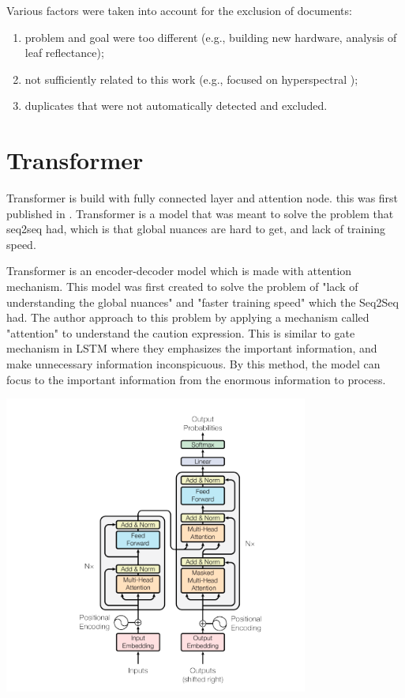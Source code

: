 Various factors were taken into account for the exclusion of documents:
\begin{enumerate}
    \item problem and goal were too different (e.g., building new hardware, analysis of leaf reflectance);
    \item not sufficiently related to this work (e.g., focused on hyperspectral );
    \item duplicates that were not automatically detected and excluded.
\end{enumerate}




\section{Transformer}
Transformer is build with fully connected layer and attention node. 
this was first published in \cite{vaswani2023attention}.
Transformer is a model that was meant to solve the problem that seq2seq had, which is that global nuances are hard to get, and lack of training speed.

Transformer is an encoder-decoder model which is made with attention mechanism. This model was first created to solve the problem of "lack of understanding the global nuances" and "faster training speed" which the Seq2Seq had. The author approach to this problem by applying a mechanism called "attention" to understand the caution expression. This is similar to gate mechanism in LSTM where they emphasizes the important information, and make unnecessary information inconspicuous. By this method, the model can focus to the important information from the enormous information to process.

\includegraphics[width=10cm]{img/transformer.png}

